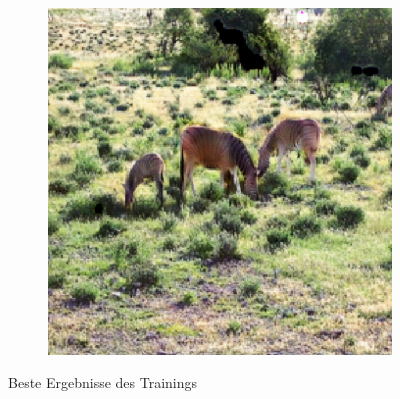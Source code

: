 \begin{figure}
\begin{subfigure}[t]{.2\textwidth}
  \end{subfigure}
  \begin{subfigure}[t]{.2\textwidth}
    \centering
    \includegraphics[width=\linewidth]{images/cycleGanResults/zebra_output2.png}
  \end{subfigure}
  \caption{Beste Ergebnisse des Trainings}

\end{figure}


